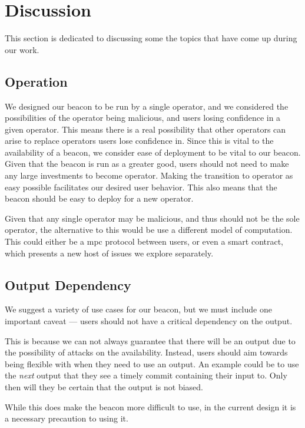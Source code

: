 \section{Discussion}%
\label{sec:discussion}
This section is dedicated to discussing some the topics that have come up during our work.


\subsection{Operation}
We designed our beacon to be run by a single operator, and we considered the possibilities of the operator being malicious, and users losing confidence in a given operator.
This means there is a real possibility that other operators can arise to replace operators users lose confidence in. Since this is vital to the availability of a beacon, we consider ease of deployment to be vital to our beacon. Given that the beacon is run as a greater good, users should not need to make any large investments to become operator. Making the transition to operator as easy possible facilitates our desired user behavior. This also means that the beacon should be easy to deploy for a new operator.

Given that any single operator may be malicious, and thus should not be the sole operator, the alternative to this would be use a different model of computation. This could either be a \acrshort{mpc} protocol between users, or even a smart contract, which presents a new host of issues we explore separately.

\subsection{Output Dependency}
We suggest a variety of use cases for our beacon, but we must include one important caveat --- users should not have a critical dependency on the output.

This is because we can not always guarantee that there will be an output due to the possibility of attacks on the availability.
Instead, users should aim towards being flexible with when they need to use an output. An example could be to use the \textit{next} output that they see a timely commit containing their input to. Only then will they be certain that the output is not biased.

While this does make the beacon more difficult to use, in the current design it is a necessary precaution to using it.


